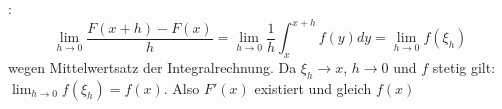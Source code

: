 \Bew {}:
$$\lim_{h\to 0} \frac{F(x + h) - F(x)}{h} = \lim_{h\to 0} \frac{1}{h} \int_{x}^{x + h} f(y) dy = \lim_{h\to 0} f(\xi_h)$$
wegen Mittelwertsatz der Integralrechnung. Da $\xi_h \to x$, $h \to 0$ und $f$ stetig gilt:
$\lim_{h\to 0} f(\xi_h) = f(x)$. Also $F'(x)$ existiert und gleich $f(x)$